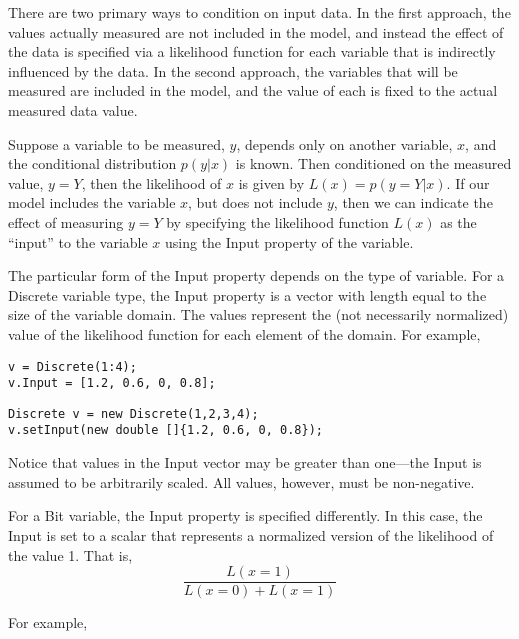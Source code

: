 There are two primary ways to condition on input data.  In the first approach, the values actually measured are not included in the model, and instead the effect of the data is specified via a likelihood function for each variable that is indirectly influenced by the data.  In the second approach, the variables that will be measured are included in the model, and the value of each is fixed to the actual measured data value.

\label{sec:LikelihoodInput}

Suppose a variable to be measured, $y$, depends only on another variable, $x$, and the conditional distribution $p(y|x)$ is known.  Then conditioned on the measured value, $y = Y$, then the likelihood of $x$ is given by $L(x) = p(y = Y | x)$.  If our model includes the variable $x$, but does not include $y$, then we can indicate the effect of measuring $y = Y$ by specifying the likelihood function $L(x)$ as the ``input'' to the variable $x$ using the Input property of the variable.

The particular form of the Input property depends on the type of variable.  For a Discrete variable type, the Input property is a vector with length equal to the size of the variable domain.  The values represent the (not necessarily normalized) value of the likelihood function for each element of the domain.  For example,

\ifmatlab

\begin{lstlisting}
v = Discrete(1:4);
v.Input = [1.2, 0.6, 0, 0.8];
\end{lstlisting}

\fi

\ifjava
\begin{lstlisting}
Discrete v = new Discrete(1,2,3,4);
v.setInput(new double []{1.2, 0.6, 0, 0.8});
\end{lstlisting}

\fi

Notice that values in the Input vector may be greater than one---the Input is assumed to be arbitrarily scaled.  All values, however, must be non-negative.

For a Bit variable, the Input property is specified differently.  In this case, the Input is set to a scalar that represents a normalized version of the likelihood of the value 1.  That is,
%
\[
\frac{L(x=1)}{L(x=0) + L(x=1)}
\]

For example,

\ifmatlab

